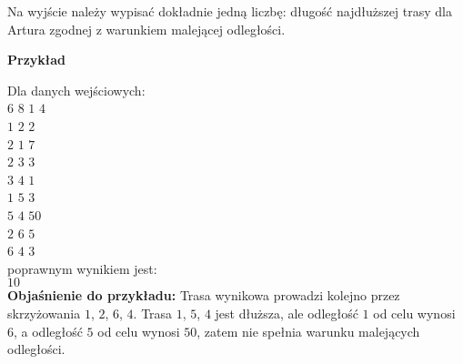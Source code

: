 \documentclass{article}
\begin{document}
	Na wyjście należy wypisać dokładnie jedną liczbę: długość najdłuższej trasy dla Artura zgodnej z warunkiem malejącej odległości.
	\begin{flushleft}
		\LARGE \textbf{Przykład}
	\end{flushleft}
	\smallskip 
	Dla danych wejściowych: \\
	$6$ $8$ $1$ $4$ \\
	$1$ $2$ $2$ \\
	$2$ $1$ $7$ \\
	$2$ $3$ $3$ \\
	$3$ $4$ $1$ \\
	$1$ $5$ $3$ \\
	$5$ $4$ $50$ \\
	$2$ $6$ $5$ \\
	$6$ $4$ $3$
	\smallskip \\
	poprawnym wynikiem jest: \\
	$10$
	\smallskip \\
	\textbf{Objaśnienie do przykładu:} Trasa wynikowa prowadzi kolejno przez skrzyżowania $1$, $2$, $6$, $4$. Trasa $1$, $5$, $4$ jest dłuższa, ale odległość $1$ od celu wynosi $6$, a odległość $5$ od celu wynosi $50$, zatem nie spełnia warunku malejących odległości.
\end{document}
